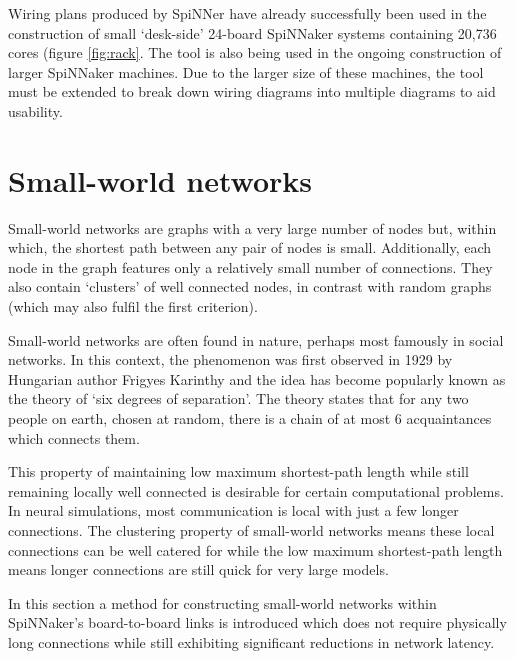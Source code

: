 			Wiring plans produced by SpiNNer have already successfully been used in
			the construction of small `desk-side' 24-board SpiNNaker systems
			containing 20,736 cores (figure \ref{fig:rack}. The tool is also being
			used in the ongoing construction of larger SpiNNaker machines. Due to the
			larger size of these machines, the tool must be extended to break down
			wiring diagrams into multiple diagrams to aid usability.
	
	
	\section{Small-world networks}
		
		
		Small-world networks are graphs with a very large number of nodes but,
		within which, the shortest path between any pair of nodes is small.
		Additionally, each node in the graph features only a relatively small number
		of connections. They also contain `clusters' of well connected nodes, in
		contrast with random graphs (which may also fulfil the first criterion).
		
		Small-world networks are often found in nature, perhaps most famously in
		social networks. In this context, the phenomenon was first observed in 1929
		by Hungarian author Frigyes Karinthy\cite{karinthy29} and the idea has
		become popularly known as the theory of `six degrees of separation'. The
		theory states that for any two people on earth, chosen at random, there is a
		chain of at most 6 acquaintances which connects them.
		
		This property of maintaining low maximum shortest-path length while still
		remaining locally well connected is desirable for certain computational
		problems. In neural simulations, most communication is local with just a few
		longer connections. The clustering property of small-world networks means
		these local connections can be well catered for while the low maximum
		shortest-path length means longer connections are still quick for very large
		models.
		
		In this section a method for constructing small-world networks within
		SpiNNaker's board-to-board links is introduced which does not require
		physically long connections while still exhibiting significant reductions in
		network latency.
		
